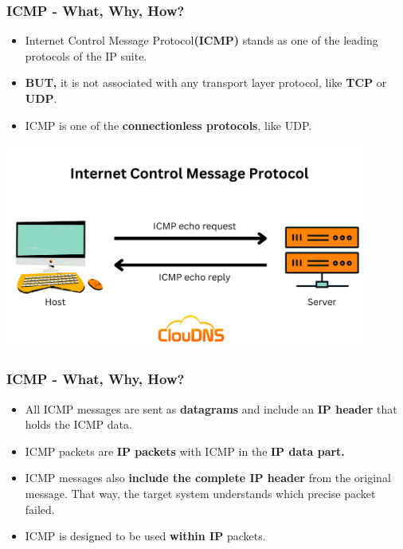 \documentclass[aspectratio=169]{beamer}
\begin{document}
\begin{frame}
\frametitle{ICMP - What, Why, How?}

\begin{itemize}
    \item Internet Control Message Protocol\textbf{(ICMP)} stands as one of the leading protocols of the IP suite.
    \item \textbf{BUT,} it is not associated with any transport layer protocol, like \textbf{TCP} or \textbf{UDP}.
    \item ICMP is one of the \textbf{connectionless protocols}, like UDP.
    
\end{itemize}

\centering\includegraphics[width=0.9\textwidth]{icmp1.png}

\end{frame}

\begin{frame}
\frametitle{ICMP - What, Why, How?}

\begin{itemize}
    \item All ICMP messages are sent as \textbf{datagrams} and include an \textbf{IP header} that holds the ICMP data.
    \item  ICMP packets are \textbf{IP packets} with ICMP in the \textbf{IP data part.}
    \item ICMP messages also \textbf{include the complete IP header} from the original message. That way, the target system understands which precise packet failed.
    \item ICMP is designed to be used \textbf{within IP} packets.
\end{itemize}

\centering{}

\end{frame}
\end{document}
